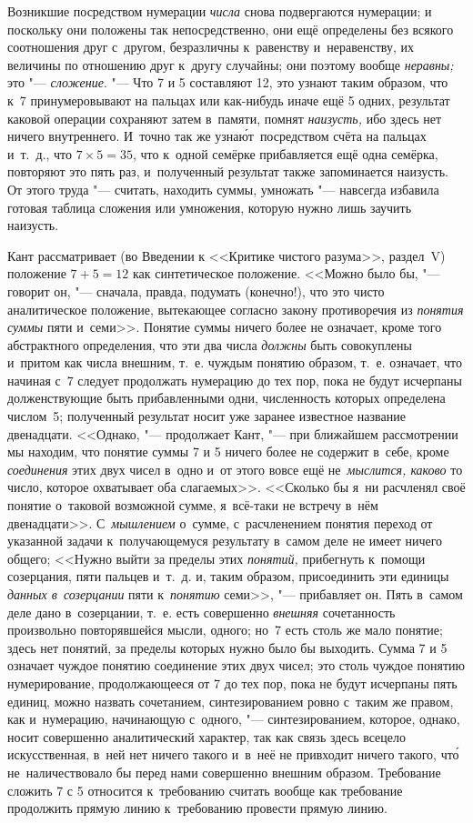 Возникшие посредством нумерации {\em числа} снова подвергаются нумерации; и
поскольку они положены так непосредственно, они ещё определены без всякого
соотношения друг с~другом, безразличны к~равенству и~неравенству, их величины
по отношению друг к~другу случайны; они поэтому вообще {\em неравны;} это "---
{\em сложение}. "--- Что 7 и 5 составляют 12, это узнают таким образом, что к~7
принумеровывают на пальцах или как-нибудь иначе ещё 5 одних, результат каковой
операции сохраняют затем в~памяти, помнят {\em наизусть,} ибо здесь нет ничего
внутреннего. И~точно так же узна\'{ю}т~посредством счёта на пальцах и~т.~д.,
что $7\times 5=35$, что к~одной семёрке прибавляется ещё одна семёрка,
повторяют это пять раз, и~полученный результат также запоминается наизусть. От
этого труда "--- считать, находить суммы, умножать "--- навсегда избавила
готовая таблица сложения или умножения, которую нужно лишь заучить наизусть.

Кант рассматривает (во Введении к <<Критике чистого разума>>, раздел~V)
положение $7+5=12$ как синтетическое положение. <<Можно было бы, "---
говорит он, "--- сначала, правда, подумать (конечно!), что это чисто
аналитическое положение, вытекающее согласно закону противоречия из
{\em понятия суммы} пяти и~семи>>. Понятие суммы ничего более не означает,
кроме того абстрактного определения, что эти два числа {\em должны} быть
совокуплены и~притом как числа внешним, т.~е. чуждым понятию образом, т.~е.
означает, что начиная с~7 следует продолжать нумерацию до тех пор, пока не
будут исчерпаны долженствующие быть прибавленными одни, численность которых
определена числом~5; полученный результат носит уже заранее известное название
двенадцати. <<Однако, "--- продолжает Кант, "--- при ближайшем рассмотрении мы
находим, что понятие суммы 7 и 5 ничего более не содержит в~себе, кроме
{\em соединения} этих двух чисел в~одно и~от этого вовсе ещё
не~{\em мыслится, каково} то число, которое охватывает оба слагаемых>>.
<<Сколько бы я~ни расчленял своё понятие о~таковой возможной сумме,
я~всё-таки не встречу в~нём двенадцати>>. С~{\em мышлением} о~сумме,
с~расчленением понятия переход от указанной задачи к~получающемуся результату
в~самом деле не имеет ничего общего; <<Нужно выйти за пределы этих
{\em понятий,} прибегнуть к~помощи
созерцания, пяти пальцев и~т.~д. и, таким образом, присоединить эти
единицы {\em данных в~созерцании} пяти к~{\em понятию} семи>>, "--- прибавляет
он. Пять в~самом деле дано в~созерцании, т.~е. есть совершенно {\em внешняя}
сочетанность произвольно повторявшейся мысли, одного; но~7 есть столь же мало
понятие; здесь нет понятий, за пределы которых нужно было бы выходить. Сумма
7 и 5 означает чуждое понятию соединение этих двух чисел; это столь чуждое
понятию нумерирование, продолжающееся от 7 до тех пор, пока не будут исчерпаны
пять единиц, можно назвать сочетанием, синтезированием ровно с~таким же правом,
как и~нумерацию, начинающую с~одного, "--- синтезированием, которое, однако,
носит совершенно аналитический характер, так как связь здесь всецело
искусственная, в~ней нет ничего такого и~в~неё не привходит ничего такого,
чт\'{о} не~наличествовало бы перед нами совершенно внешним образом. Требование
сложить 7 с 5 относится к~требованию считать вообще как требование продолжить
прямую линию к~требованию провести прямую линию.

